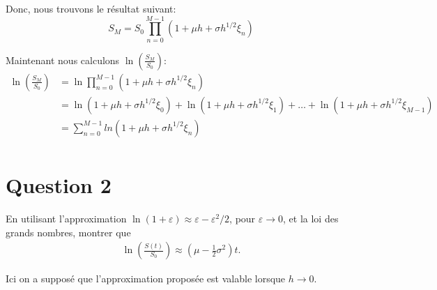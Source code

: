 \documentclass[a4paper,10pt]{report}
\begin{document}
\par \noindent Donc, nous trouvons le résultat suivant:
\begin{equation}
S_{M} = S_{0} \prod_{n=0}^{M-1} (1 + \mu h + \sigma h^{1/2} \xi_{n})
\end{equation}

\par \noindent Maintenant nous calculons $\ln(\frac{S_{M}}{S_{0}})$:
\begin{align*}
	\ln(\frac{S_{M}}{S_{0}}) &= \ln \prod_{n=0}^{M-1} (1 + \mu h + \sigma h^{1/2} \xi_{n}) \\
	&= \ln(1 + \mu h + \sigma h^{1/2} \xi_{0}) + \ln(1 + \mu h + \sigma h^{1/2} \xi_{1}) + \dots + \ln(1 + \mu h + \sigma h^{1/2} \xi_{M-1})\\
	&= \sum_{n=0}^{M-1} ln(1  + \mu h + \sigma h^{1/2} \xi_{n})\\	
\end{align*}

\section{Question 2}
\noindent En utilisant l'approximation $\ln (1 + \varepsilon) \approx \varepsilon - \varepsilon^{2} / 2$, pour $\varepsilon \rightarrow 0$, et la loi des grands nombres, montrer que
\begin{align*}
	\ln(\frac{S(t)}{S_{0}}) \approx (\mu - \frac{1}{2} \sigma^{2})t.
\end{align*}
\par \noindent Ici on a supposé que l'approximation proposée est valable lorsque $h \rightarrow 0$.
\end{document}
